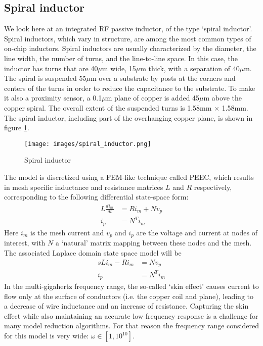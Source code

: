 \documentclass{article}
\begin{document}
	\subsection{Spiral inductor}
	We look here at an integrated RF passive inductor, of the type `spiral inductor'. Spiral inductors, which vary in structure, are among the most common types of on-chip inductors. Spiral inductors are usually characterized by the diameter, the line width, the number of turns, and the line-to-line space. In this case, the inductor has turns that are 40$\mu$m wide, 15$\mu$m thick, with a separation of 40$\mu$m. The spiral is suspended 55$\mu$m over a substrate by posts at the corners and centers of the turns in order to reduce the capacitance to the substrate. To make it also a proximity sensor, a 0.1$\mu$m plane of copper is added 45$\mu$m above the copper spiral.
	The overall extent of the suspended turns is 1.58mm × 1.58mm. The spiral inductor, including
	part of the overhanging copper plane, is shown in figure \ref{fig:PEEC}. 
	\begin{figure}[h]
		\center
		\texttt{[image: images/spiral\_inductor.png]}
		\caption{Spiral inductor}\label{fig:PEEC}
	\end{figure}
	The model is discretized using a FEM-like technique called PEEC, which results in mesh specific inductance and resistance matrices $L$ and $R$ respectively, corresponding to the following differential state-space form:
	\begin{align*}
		L\frac{di_m}{dt}&=Ri_m+Nv_p\\
		i_p&=N^Ti_m
	\end{align*}
	Here $i_m$ is the mesh current and $v_p$ and $i_p$ are the voltage and current at nodes of interest, with $N$ a `natural' matrix mapping between these nodes and the mesh.
	The associated Laplace domain state space model will be
	\begin{equation}
		\begin{aligned}
			sL i_m - R i_m &= N v_p\\
			i_p&=N^Ti_m
		\end{aligned}
	\end{equation} 
	In the multi-gigahertz frequency range, the so-called `skin effect' causes current to
	flow only at the surface of conductors (i.e. the copper coil and plane), leading to a decrease of wire
	inductance and an increase of resistance. Capturing the skin eﬀect while also maintaining an accurate low frequency response is a challenge for many model reduction algorithms. For that reason the frequency range considered for this model is very wide: $\omega\in[1,10^{10}]$.
\end{document}
